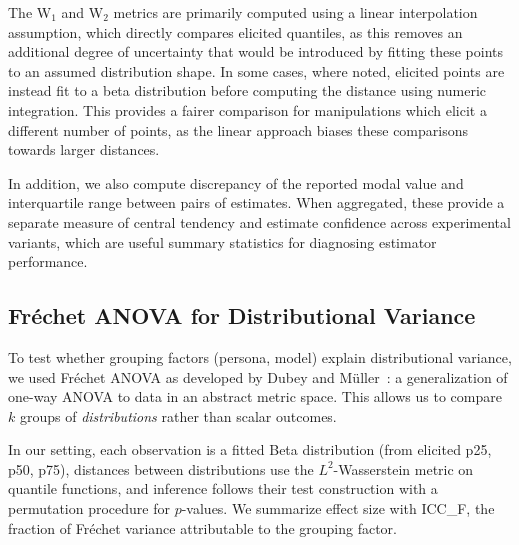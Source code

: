 \documentclass[midterm]{sparreport}
\begin{document}
The W$_1$ and W$_2$ metrics are primarily computed using a linear interpolation assumption, which directly compares elicited quantiles, as this removes an additional degree of uncertainty that would be introduced by fitting these points to an assumed distribution shape. In some cases, where noted, elicited points are instead fit to a beta distribution before computing the distance using numeric integration. This provides a fairer comparison for manipulations which elicit a different number of points, as the linear approach biases these comparisons towards larger distances.

In addition, we also compute discrepancy of the reported modal value and interquartile range between pairs of estimates. When aggregated, these provide a separate measure of central tendency and estimate confidence across experimental variants, which are useful summary statistics for diagnosing estimator performance.

\subsection{Fréchet ANOVA for Distributional Variance}

To test whether grouping factors (persona, model) explain distributional variance, we used Fréchet ANOVA as developed by Dubey and Müller~\cite{dubey2019frechet}: a generalization of one-way ANOVA to data in an abstract metric space. This allows us to compare $k$ groups of \emph{distributions} rather than scalar outcomes.

In our setting, each observation is a fitted Beta distribution (from elicited p25, p50, p75), distances between distributions use the $L^2$-Wasserstein metric on quantile functions, and inference follows their test construction with a permutation procedure for $p$-values. We summarize effect size with ICC\_F, the fraction of Fréchet variance attributable to the grouping factor.
\end{document}
